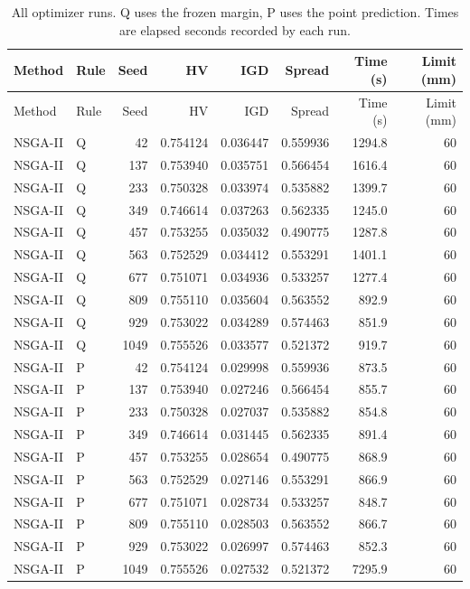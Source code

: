 \begin{longtable}{llrrrrrr}
\caption{All optimizer runs. Q uses the frozen margin, P uses the point prediction. Times are elapsed seconds recorded by each run.}\label{tab:s_optimizer_runs}\\
\toprule
Method & Rule & Seed & HV & IGD & Spread & Time (s) & Limit (mm) \\
\midrule
\endfirsthead
\toprule
Method & Rule & Seed & HV & IGD & Spread & Time (s) & Limit (mm) \\
\midrule
\endhead
NSGA-II & Q & 42 & 0.754124 & 0.036447 & 0.559936 & 1294.8 & 60 \\
NSGA-II & Q & 137 & 0.753940 & 0.035751 & 0.566454 & 1616.4 & 60 \\
NSGA-II & Q & 233 & 0.750328 & 0.033974 & 0.535882 & 1399.7 & 60 \\
NSGA-II & Q & 349 & 0.746614 & 0.037263 & 0.562335 & 1245.0 & 60 \\
NSGA-II & Q & 457 & 0.753255 & 0.035032 & 0.490775 & 1287.8 & 60 \\
NSGA-II & Q & 563 & 0.752529 & 0.034412 & 0.553291 & 1401.1 & 60 \\
NSGA-II & Q & 677 & 0.751071 & 0.034936 & 0.533257 & 1277.4 & 60 \\
NSGA-II & Q & 809 & 0.755110 & 0.035604 & 0.563552 & 892.9 & 60 \\
NSGA-II & Q & 929 & 0.753022 & 0.034289 & 0.574463 & 851.9 & 60 \\
NSGA-II & Q & 1049 & 0.755526 & 0.033577 & 0.521372 & 919.7 & 60 \\
NSGA-II & P & 42 & 0.754124 & 0.029998 & 0.559936 & 873.5 & 60 \\
NSGA-II & P & 137 & 0.753940 & 0.027246 & 0.566454 & 855.7 & 60 \\
NSGA-II & P & 233 & 0.750328 & 0.027037 & 0.535882 & 854.8 & 60 \\
NSGA-II & P & 349 & 0.746614 & 0.031445 & 0.562335 & 891.4 & 60 \\
NSGA-II & P & 457 & 0.753255 & 0.028654 & 0.490775 & 868.9 & 60 \\
NSGA-II & P & 563 & 0.752529 & 0.027146 & 0.553291 & 866.9 & 60 \\
NSGA-II & P & 677 & 0.751071 & 0.028734 & 0.533257 & 848.7 & 60 \\
NSGA-II & P & 809 & 0.755110 & 0.028503 & 0.563552 & 866.7 & 60 \\
NSGA-II & P & 929 & 0.753022 & 0.026997 & 0.574463 & 852.3 & 60 \\
NSGA-II & P & 1049 & 0.755526 & 0.027532 & 0.521372 & 7295.9 & 60 \\

\end{longtable}

